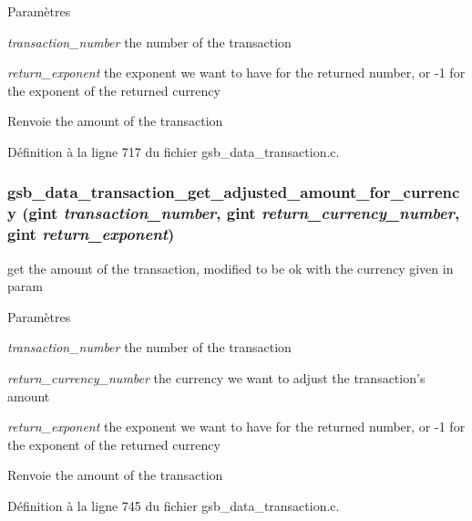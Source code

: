 \begin{DoxyParams}{Paramètres}
\item[{\em transaction\_\-number}]the number of the transaction \item[{\em return\_\-exponent}]the exponent we want to have for the returned number, or -\/1 for the exponent of the returned currency\end{DoxyParams}
\begin{DoxyReturn}{Renvoie}
the amount of the transaction 
\end{DoxyReturn}


Définition à la ligne 717 du fichier gsb\_\-data\_\-transaction.c.

\subsubsection[{gsb\_\-data\_\-transaction\_\-get\_\-adjusted\_\-amount\_\-for\_\-currency}]{ gsb\_\-data\_\-transaction\_\-get\_\-adjusted\_\-amount\_\-for\_\-currency (gint {\em transaction\_\-number}, \/  gint {\em return\_\-currency\_\-number}, \/  gint {\em return\_\-exponent})}\label{gsb__data__transaction_8h_a8f44da078801e109873c479399b72191}
get the amount of the transaction, modified to be ok with the currency given in param


\begin{DoxyParams}{Paramètres}
\item[{\em transaction\_\-number}]the number of the transaction \item[{\em return\_\-currency\_\-number}]the currency we want to adjust the transaction's amount \item[{\em return\_\-exponent}]the exponent we want to have for the returned number, or -\/1 for the exponent of the returned currency\end{DoxyParams}
\begin{DoxyReturn}{Renvoie}
the amount of the transaction 
\end{DoxyReturn}


Définition à la ligne 745 du fichier gsb\_\-data\_\-transaction.c.

